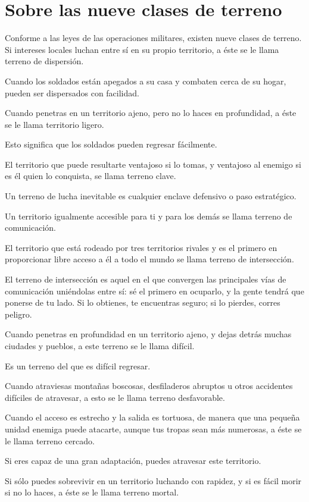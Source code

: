 \chapter{Sobre las nueve clases de terreno}

Conforme a las leyes de las operaciones militares, existen nueve clases de terreno. Si intereses locales luchan entre sí en su propio territorio, a éste se le llama terreno de dispersión.

Cuando los soldados están apegados a su casa y combaten cerca de su hogar, pueden ser dispersados con facilidad.

Cuando penetras en un territorio ajeno, pero no lo haces en profundidad, a éste se le llama territorio ligero.

Esto significa que los soldados pueden regresar fácilmente.

El territorio que puede resultarte ventajoso si lo tomas, y ventajoso al enemigo si es él quien lo conquista, se llama terreno clave.

Un terreno de lucha inevitable es cualquier enclave defensivo o paso estratégico.

Un territorio igualmente accesible para ti y para los demás se llama terreno de comunicación.

El territorio que está rodeado por tres territorios rivales y es el primero en proporcionar libre acceso a él a todo el mundo se llama terreno de intersección.

El terreno de intersección es aquel en el que convergen las principales vías de comunicación uniéndolas entre sí: sé el primero en ocuparlo, y la gente tendrá que ponerse de tu lado. Si lo obtienes, te encuentras seguro; si lo pierdes, corres peligro.

Cuando penetras en profundidad en un territorio ajeno, y dejas detrás muchas ciudades y pueblos, a este terreno se le llama difícil.

Es un terreno del que es difícil regresar.

Cuando atraviesas montañas boscosas, desfiladeros abruptos u otros accidentes difíciles de atravesar, a esto se le llama terreno desfavorable.

Cuando el acceso es estrecho y la salida es tortuosa, de manera que una pequeña unidad enemiga puede atacarte, aunque tus tropas sean más numerosas, a éste se le llama terreno cercado.

Si eres capaz de una gran adaptación, puedes atravesar este territorio.

Si sólo puedes sobrevivir en un territorio luchando con rapidez, y si es fácil morir si no lo haces, a éste se le llama terreno mortal.

